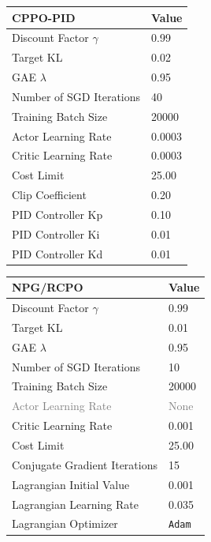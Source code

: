 \documentclass{article}
\begin{document}
\begin{table}[ht]
{\begin{subtable}{.5\textwidth}
  \centering
  \begin{tabular}{ll}
    \toprule
    \textbf{CPPO-PID} & \textbf{Value} \\
    \midrule
    Discount Factor $\gamma$ & 0.99 \\
    Target KL & 0.02 \\
    GAE $\lambda$ & 0.95 \\
    Number of SGD Iterations & 40 \\
    Training Batch Size & 20000 \\
    Actor Learning Rate & 0.0003 \\
    Critic Learning Rate & 0.0003 \\
    Cost Limit & 25.00 \\
    Clip Coefficient & 0.20\\
    PID Controller Kp & 0.10 \\
    PID Controller Ki & 0.01 \\
    PID Controller Kd & 0.01 \\
    \bottomrule
  \end{tabular}
\end{subtable}\hfill 
\begin{subtable}{.5\textwidth}
  \centering
  \begin{tabular}{ll}
    \toprule
    \textbf{NPG/RCPO} & \textbf{Value} \\
    \midrule
    Discount Factor $\gamma$ & 0.99 \\
    Target KL & 0.01 \\
    GAE $\lambda$ & 0.95 \\
    Number of SGD Iterations & 10 \\
    Training Batch Size & 20000 \\
    \textcolor{gray}{Actor Learning Rate} & \textcolor{gray}{None} \\
    Critic Learning Rate & 0.001 \\
    Cost Limit & 25.00 \\
    Conjugate Gradient Iterations & 15 \\
    Lagrangian Initial Value & 0.001 \\
    Lagrangian Learning Rate & 0.035 \\
    Lagrangian Optimizer & \texttt{Adam} \\
    \bottomrule
  \end{tabular}
\end{subtable}
\begin{subtable}{.5\textwidth}

\end{subtable}}
\end{table}
\end{document}

